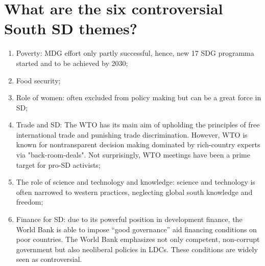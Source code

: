 \section{What are the six controversial South SD themes?}
\begin{enumerate}
\item Poverty: MDG effort only partly successful, hence, new 17 SDG programma started and to be achieved by 2030;
\item Food security;
\item Role of women: often excluded from policy making but can be a great force in SD;
\item Trade and SD: The WTO has its main aim of upholding the principles of free international trade and punishing trade discrimination. However, WTO is known for nontransparent decision making dominated by rich-country experts via "back-room-deals". Not surprisingly, WTO meetings have been a prime target for pro-SD activists;
\item The role of science and technology and knowledge: science and technology is often narrowed to western practices, neglecting global south knowledge and freedom;
\item Finance for SD: due to its powerful position in development finance, the World Bank is able to impose “good governance” aid financing conditions on poor countries. The World Bank emphasizes not only competent, non-corrupt government but also neoliberal policies in LDCs. These conditions are widely seen as controversial.
\end{enumerate}

\clearpage

